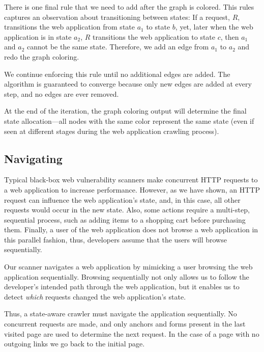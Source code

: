 There is one final rule that we need to add after the graph is colored. This
rules captures an observation about transitioning between states: If a request,
$R$, transitions the web application from state $a_1$ to state $b$, yet, later
when the web application is in state $a_2$, $R$ transitions the web application
to state $c$, then $a_1$ and $a_2$ cannot be the same state. Therefore, we add
an edge from $a_1$ to $a_2$ and redo the graph coloring.

We continue enforcing this rule until no additional edges are added. The
algorithm is guaranteed to converge because only new edges are added at every
step, and no edges are ever removed. 

At the end of the iteration, the graph coloring output will determine the final
state allocation---all nodes with the same color represent the same state (even
if seen at different stages during the web application crawling process).

\subsection{Navigating}

Typical black-box web vulnerability scanners make concurrent HTTP requests to a
web application to increase performance. However, as we have shown, an HTTP
request can influence the web application's state, and, in this case, all other
requests would occur in the new state. Also, some actions require a multi-step,
sequential process, such as adding items to a shopping cart before purchasing
them. Finally, a user of the web application does not browse a web application
in this parallel fashion, thus, developers assume that the users will browse
sequentially.

Our scanner navigates a web application by mimicking a user browsing the web
application sequentially. Browsing sequentially not only allows us to follow
the developer's intended path through the web application, but it enables us to
detect \emph{which} requests changed the web application's state.

Thus, a state-aware crawler must navigate the application sequentially. No
concurrent requests are made, and only anchors and forms present in the last
visited page are used to determine the next request. In the case of a page
with no outgoing links we go back to the initial page.

